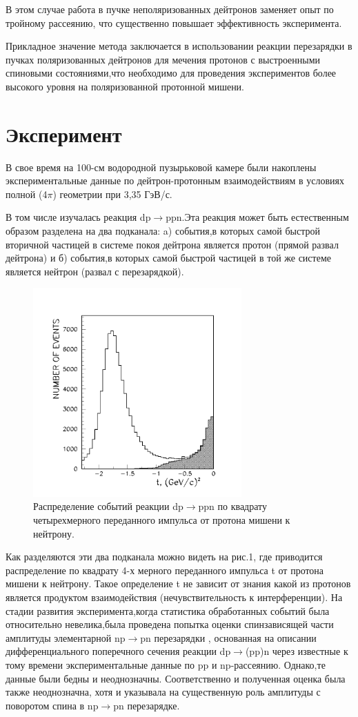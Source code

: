 \documentclass[a4paper,12pt]{article}
\begin{document}
В этом случае работа в пучке неполяризованных дейтронов заменяет опыт по
тройному рассеянию, что существенно повышает эффективность эксперимента.

Прикладное значение метода заключается в использовании реакции перезарядки в
пучках поляризованных дейтронов для мечения протонов с выстроенными спиновыми
состояниями,что необходимо для проведения экспериментов более высокого уровня на
поляризованной протонной мишени.

\section{Эксперимент}
В свое время на 100-см водородной пузырьковой камере были накоплены
экспериментальные данные по дейтрон-протонным взаимодействиям в условиях полной
(4$\pi$) геометрии при 3,35 ГэВ/с.

В том числе изучалась реакция dp$\to$ppn.Эта реакция может быть естественным
образом разделена на два подканала: a) события,в которых самой быстрой вторичной
частицей в системе покоя дейтрона является протон (прямой развал дейтрона) и б)
события,в которых самой быстрой частицей в той же системе является нейтрон
(развал с перезарядкой).

\begin{figure}[h]
  \begin{center}
    \includegraphics[width=8cm]{dist.pdf}
    \caption {Распределение событий реакции dp$\to$ppn по квадрату
      четырехмерного переданного импульса от протона мишени к нейтрону.}
  \end{center}
\end{figure}

Как разделяются эти два подканала можно видеть на рис.1, где приводится
распределение по квадрату 4-х мерного переданного импульса t от протона мишени к
нейтрону. Такое определение t не зависит от знания какой из протонов является
продуктом взаимодействия (нечувствительность к интерференции). На стадии
развития эксперимента,когда статистика обработанных событий была относительно
невелика,была проведена попытка оценки спинзависящей части амплитуды
элементарной np$\to$pn перезарядки \cite{Ala}, основанная на описании
дифференциального поперечного сечения реакции dp$\to$(pp)n через известные к
тому времени экспериментальные данные по pp и np-рассеянию. Однако,те данные
были бедны и неоднозначны. Соответственно и полученная оценка была также
неоднозначна, хотя и указывала на существенную роль амплитуды с поворотом спина
в np$\to$pn перезарядке.
\end{document}
